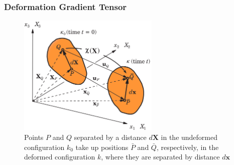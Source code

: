 \documentclass[notes]{beamer}
\begin{document}
\begin{frame}
\frametitle{Deformation Gradient Tensor}

\begin{figure}
	\includegraphics[width=0.6\textwidth]{figs/green-strain.png}
	\caption*{Points $P$ and $Q$ separated by a distance $d\mathbf{X}$ in the undeformed configuration $k_0$ take up positions $\bar{P}$ and $\bar{Q}$, respectively, in the deformed configuration $k$, where they are separated by distance $d\mathbf{x}$}
\end{figure}
\end{frame}

\end{document}
